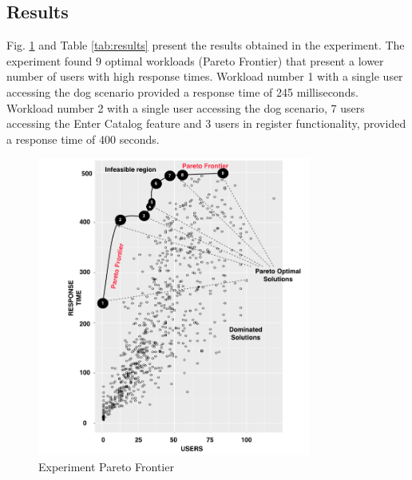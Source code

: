 \documentclass[espaco=umemeio,chapter=TITLE,twoside,openright]{abnt}
\begin{document}
\subsection{Results}

Fig. \ref{fig:paretofrontier1} and Table \ref{tab:results} present the results obtained in the experiment. The experiment found 9 optimal workloads (Pareto Frontier) that present a lower number of users with high response times. Workload number 1 with a single user accessing the dog scenario provided a response time of 245 milliseconds.  Workload number 2 with a single user accessing the dog scenario, 7 users accessing the Enter Catalog feature and 3 users in register functionality, provided a response time of 400 seconds.



\begin{figure}[h]
\centering
\includegraphics[width=0.8\textwidth]{./images/pareto0curve.png}
    \caption{Experiment Pareto Frontier}
\label{fig:paretofrontier1}
\end{figure}
\end{document}
